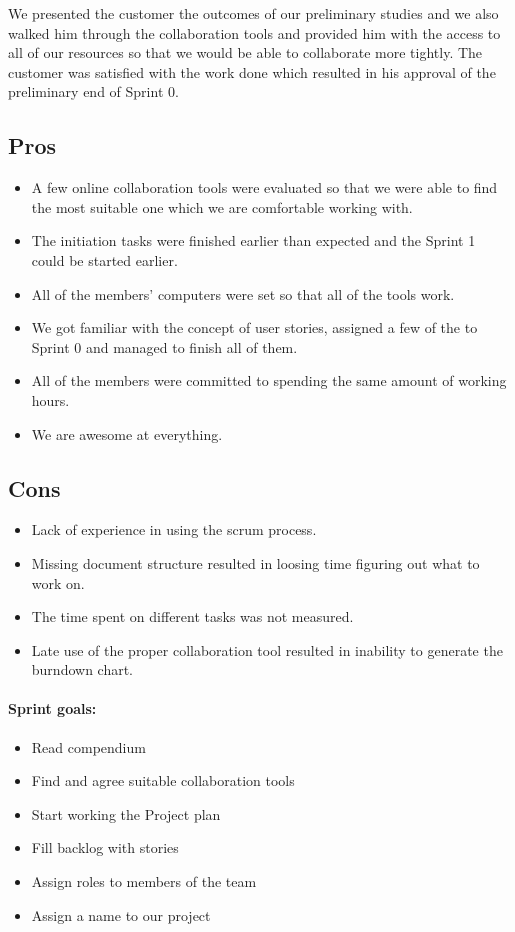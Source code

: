 We presented the customer the outcomes of our preliminary studies and we also walked him through the collaboration tools and provided him with the access to all of our resources so that we would be able to collaborate more tightly. The customer was satisfied with the work done which resulted in his approval of the preliminary end of Sprint 0.

\subsection{Pros}
\begin{itemize}
\item A few online collaboration tools were evaluated so that we were able to find the most suitable one which we are comfortable working with.
\item The initiation tasks were finished earlier than expected and the Sprint 1 could be started earlier.
\item All of the members' computers were set so that all of the tools work.
\item We got familiar with the concept of user stories, assigned a few of the to Sprint 0 and managed to finish all of them.
\item All of the members were committed to spending the same amount of working hours.
\item We are awesome at everything.
\end{itemize}

\subsection{Cons}
\begin{itemize}
\item Lack of experience in using the scrum process.
\item Missing document structure resulted in loosing time figuring out what to work on.
\item The time spent on different tasks was not measured.
\item Late use of the proper collaboration tool resulted in inability to generate the burndown chart.
\end{itemize}

\paragraph{Sprint goals:}
\begin{itemize}
    \item Read compendium
    \item Find and agree suitable collaboration tools
    \item Start working the Project plan
    \item Fill backlog with stories
    \item Assign roles to members of the team
    \item Assign a name to our project
\end{itemize}